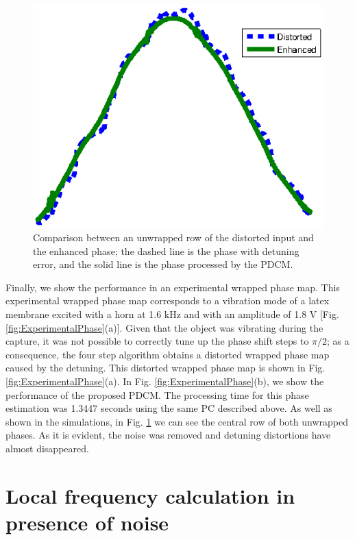 \begin{figure}[Ht!]
  \begin{center}
      \includegraphics[scale=0.6]{Chpt4_figures/fig_E3.eps}
  \end{center}
  \caption{Comparison between an unwrapped 
    row of the distorted input and the enhanced phase; the dashed line is 
    the phase with detuning error, and the solid line is the phase processed 
    by the PDCM.}
  \label{fig:ExperimentalPhasetemp}
\end{figure}

Finally, we show the performance in an experimental wrapped phase map. This
experimental wrapped phase map corresponds to a vibration mode of a latex
membrane excited with a horn at 1.6 kHz and with an amplitude of 1.8 V [Fig.
\ref{fig:ExperimentalPhase}(a)]. Given that the object was vibrating 
during the capture, it was not possible to correctly tune up the phase 
shift steps to $\pi/2$; as a consequence, the four step algorithm obtains 
a distorted wrapped phase map caused by the detuning. This distorted wrapped 
phase map is shown in Fig. \ref{fig:ExperimentalPhase}(a). In Fig. 
\ref{fig:ExperimentalPhase}(b), we show the performance of the proposed 
PDCM. The processing time for this phase estimation was 1.3447 seconds using
the same PC described above. As well as shown in the simulations, in Fig. 
\ref{fig:ExperimentalPhasetemp} we can see the central row of both 
unwrapped phases. As it is evident, the noise was removed and
detuning distortions have almost disappeared.

\section{Local frequency calculation in presence of noise}

